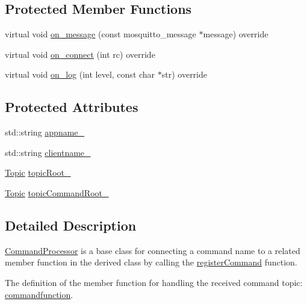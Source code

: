\subsection*{Protected Member Functions}
\begin{DoxyCompactItemize}
\item 
virtual void \hyperlink{class_command_processor_ab1a2cf5d74c8bbd9bbcf57c7a4b14c66}{on\+\_\+message} (const mosquitto\+\_\+message $\ast$message) override
\item 
virtual void \hyperlink{class_command_processor_a242db95796f5dd1b17a139ed19d6ecfa}{on\+\_\+connect} (int rc) override
\item 
virtual void \hyperlink{class_command_processor_a7300ca2e9cd0237f17ce82f64123e553}{on\+\_\+log} (int level, const char $\ast$str) override
\end{DoxyCompactItemize}
\subsection*{Protected Attributes}
\begin{DoxyCompactItemize}
\item 
std\+::string \hyperlink{class_command_processor_aab13edb02dbcc123e831e1cce20695a0}{appname\+\_\+}
\item 
std\+::string \hyperlink{class_command_processor_a3922d658643297c47765181a251b10d3}{clientname\+\_\+}
\item 
\hyperlink{class_topic}{Topic} \hyperlink{class_command_processor_a97f0d615c62c8c7e1712522c4577ea53}{topic\+Root\+\_\+}
\item 
\hyperlink{class_topic}{Topic} \hyperlink{class_command_processor_ac695d4ff50c2dd91b25c8079b22170e4}{topic\+Command\+Root\+\_\+}
\end{DoxyCompactItemize}


\subsection{Detailed Description}
\hyperlink{class_command_processor}{Command\+Processor} is a base class for connecting a command name to a related member function in the derived class by calling the \hyperlink{class_command_processor_a72e15bc0082d628bd05aacedd5aa7ee0}{register\+Command} function.

The definition of the member function for handling the received command topic\+: \hyperlink{_command_processor_8h_a28db7178a71eff1027c055c9b19f6215}{commandfunction}.

